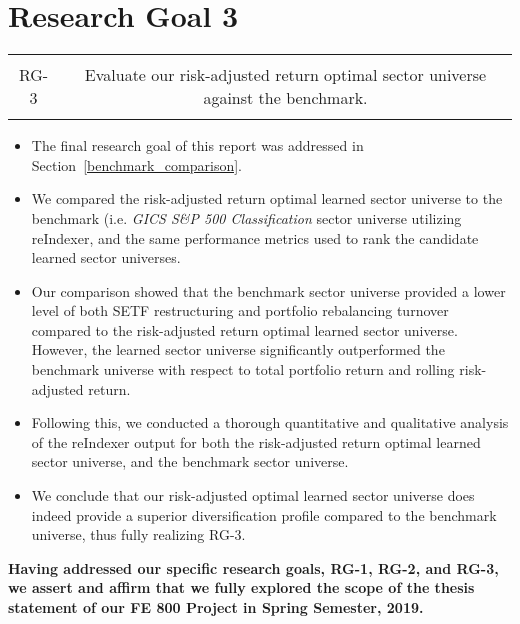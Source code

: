 \documentclass[../main.tex]{subfiles}
\begin{document}
\section{Research Goal 3}

\begin{table}[h!]
    \centering
    \begin{tabular}{| c | c |}
        \hline
        &  \\
        RG-3 & Evaluate our risk-adjusted return optimal sector universe against the benchmark. \\
        & \\
        \hline
    \end{tabular}
\end{table}

\begin{itemize}
    \item The final research goal of this report was addressed in Section~\ref{benchmark_comparison}.
    \item We compared the risk-adjusted return optimal learned sector universe to the benchmark (i.e. \textit{GICS S\&P 500 Classification} sector universe utilizing reIndexer, and the same performance metrics used to rank the candidate learned sector universes.
    \item Our comparison showed that the benchmark sector universe provided a lower level of both SETF restructuring and portfolio rebalancing turnover compared to the risk-adjusted return optimal learned sector universe. However, the learned sector universe significantly outperformed the benchmark universe with respect to total portfolio return and rolling risk-adjusted return.
    \item Following this, we conducted a thorough quantitative and qualitative analysis of the reIndexer output for both the risk-adjusted return optimal learned sector universe, and the benchmark sector universe.
    \item We conclude that our risk-adjusted optimal learned sector universe does indeed provide a superior diversification profile compared to the benchmark universe, thus fully realizing RG-3.
\end{itemize}

\vspace*{\fill}

\begin{center}
    \bfseries Having addressed our specific research goals, RG-1, RG-2, and RG-3, we assert and affirm that we fully explored the scope of the thesis statement of our FE 800 Project in Spring Semester, 2019.
\end{center}

\vspace*{\fill}
\end{document}
